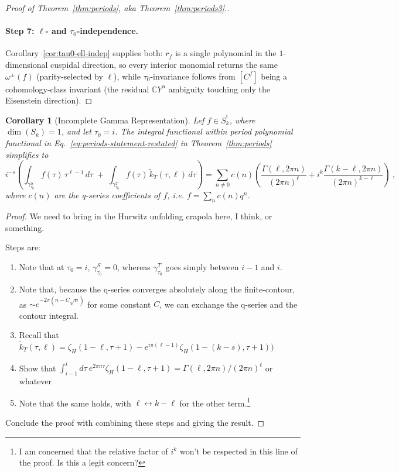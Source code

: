 \documentclass[11pt]{article}
\newtheorem{corollary}[theorem]{Corollary}
\numberwithin{equation}{section}  %
\newcommand{\CC}{\mathbb{C}}
\begin{document}
\begin{proof}[Proof of Theorem~\ref{thm:periods}, aka Theorem~\ref{thm:periods3}.]
\paragraph{Step 7: $\ell$- and $\tau_0$-independence.}
Corollary~\ref{cor:tau0-ell-indep} supplies both: $r_f$ is a single
polynomial in the $1$-dimensional cuspidal direction, so every interior
monomial returns the same $\omega^\pm(f)$ (parity-selected by $\ell$),
while $\tau_0$-invariance follows from $[C^f]$ being a cohomology-class
invariant (the residual $\CC Y^n$ ambiguity touching only the
Eisenstein direction).

\end{proof}


\begin{corollary}[Incomplete Gamma Representation]\label{cor:periods}
Lef $f \in S_k^!$, where $\dim(S_k)=1$, and let $\tau_0 = i$. The integral
functional within period polynomial functional in Eq.~\eqref{eq:periods-statement-restated} 
in Theorem~\ref{thm:periods} simplifies to
\begin{equation}\label{eq:cor_periods}
    i^{-s}\left(\int_{\gamma^S_{\tau_0}}\!\! f(\tau)\,\tau^{\ell - 1}\,d\tau
    \;+\;
    \int_{\gamma^T_{\tau_0}}\!\! f(\tau)\,\widetilde{k}_T(\tau, \ell)\,d\tau\right)
    = \sum_{n \neq 0} c(n) \left(\frac{\Gamma(\ell, 2 \pi n)}{(2\pi n)^\ell}+ i^k \frac{\Gamma(k-\ell, 2\pi n)}{(2 \pi n)^{k-\ell}}\right)~,
\end{equation}
where $c(n)$ are the q-series coefficients of $f$, i.e. $f = \sum_n c(n) q^n$.
\end{corollary}
\begin{proof}
We need to bring in the Hurwitz unfolding crapola here, I think, or something.

Steps are:
\begin{enumerate}
\item Note that at $\tau_0 = i$, $\gamma^S_{\tau_0} = 0$, whereas $\gamma^T_{\tau_0}$ goes simply between $i-1$ and $i$.
\item Note that, because the q-series converges absolutely along the finite-contour, as $\sim e^{-2 \pi (n - C \sqrt{n})}$ for some constant $C$, we can exchange the q-series and the contour integral. 
\item Recall that $\widetilde{k}_T(\tau, \ell) = \zeta_H(1-\ell, \tau+1) - e^{i \pi (\ell-1)} \zeta_H(1-(k-s), \tau+1))$
\item Show that $\int_{i-1}^i d\tau~e^{2 \pi n \tau} \zeta_H(1-\ell, \tau+1) = \Gamma(\ell, 2 \pi n)/(2\pi n)^\ell$ or whatever
\item Note that the same holds, with $\ell \leftrightarrow k-\ell$ for the other term.\footnote{I am concerned that the relative factor of $i^k$ won't be respected in this line of the proof. Is this a legit concern?}
\end{enumerate}
Conclude the proof with combining these steps and giving the result.
\end{proof}
\end{document}
